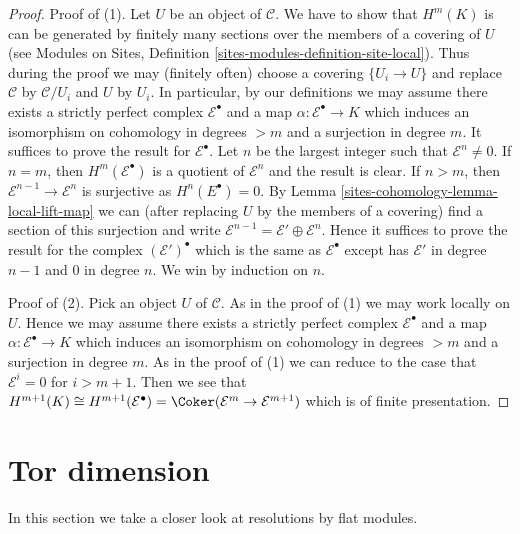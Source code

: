 \begin{proof}
Proof of (1). Let $U$ be an object of $\mathcal{C}$. We have to show that
$H^m(K)$ is can be generated by finitely many sections over the members of
a covering of $U$ (see
Modules on Sites, Definition \ref{sites-modules-definition-site-local}).
Thus during the proof we may (finitely often) choose a covering
$\{U_i \to U\}$ and replace $\mathcal{C}$ by $\mathcal{C}/U_i$ and
$U$ by $U_i$. In particular, by our definitions we may assume there exists
a strictly perfect complex $\mathcal{E}^\bullet$ and a map
$\alpha : \mathcal{E}^\bullet \to K$ which induces
an isomorphism on cohomology in degrees $> m$ and a surjection in degree $m$.
It suffices to prove the result for $\mathcal{E}^\bullet$.
Let $n$ be the largest integer such that $\mathcal{E}^n \not = 0$.
If $n = m$, then $H^m(\mathcal{E}^\bullet)$ is a quotient of
$\mathcal{E}^n$ and the result is clear.
If $n > m$, then $\mathcal{E}^{n - 1} \to \mathcal{E}^n$ is surjective as
$H^n(E^\bullet) = 0$. By Lemma \ref{sites-cohomology-lemma-local-lift-map}
we can (after replacing $U$ by the members of a covering)
find a section of this surjection and write
$\mathcal{E}^{n - 1} = \mathcal{E}' \oplus \mathcal{E}^n$.
Hence it suffices to prove the result for the complex
$(\mathcal{E}')^\bullet$ which is the same as $\mathcal{E}^\bullet$
except has $\mathcal{E}'$ in degree $n - 1$ and $0$ in degree $n$.
We win by induction on $n$.

\medskip\noindent
Proof of (2). Pick an object $U$ of $\mathcal{C}$.
As in the proof of (1) we may work locally on $U$.
Hence we may assume there exists a strictly perfect complex
$\mathcal{E}^\bullet$ and a map
$\alpha : \mathcal{E}^\bullet \to K$ which induces
an isomorphism on cohomology in degrees $> m$ and a surjection in degree $m$.
As in the proof of (1) we can reduce to the case that $\mathcal{E}^i = 0$
for $i > m + 1$. Then we see that
$H^{m + 1}(K) \cong H^{m + 1}(\mathcal{E}^\bullet) =
\Coker(\mathcal{E}^m \to \mathcal{E}^{m + 1})$
which is of finite presentation.
\end{proof}

\section{Tor dimension}
\label{sites-cohomology-section-tor}
In this section we take a closer look at resolutions by flat modules.

